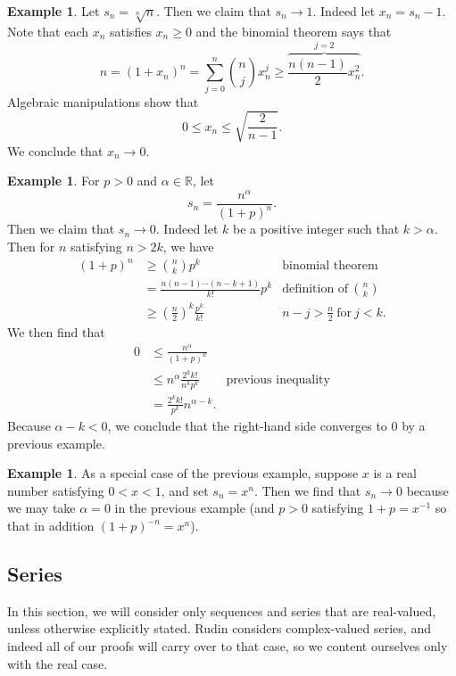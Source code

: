 \documentclass[12pt]{article}
\theoremstyle{definition}
\newtheorem{example}[definition]{Example}
\theoremstyle{theorem}
\begin{document}
\begin{example}
Let $s_n = \sqrt[n]{n}$. Then we claim that $s_n \to 1$. Indeed let $x_n = s_n - 1$. Note that each $x_n$ satisfies $x_n \geqslant 0$ and the binomial theorem says that 
\[
n = (1 + x_n)^n = \sum_{j=0}^n {{n}\choose{j}} x_n^j \geqslant \overbrace{\frac{n(n-1)}{2}x_n^2}^{j=2}.
\]
Algebraic manipulations show that 
\[
0 \leqslant x_n \leqslant \sqrt{\frac{2}{n-1}}.
\]
We conclude that $x_n \to 0$. 
\end{example}

\begin{example}
For $p > 0$ and $\alpha \in \mathbb{R}$, let 
\[
s_n = \frac{n^\alpha}{(1 + p)^n}.
\]
Then we claim that $s_n \to 0$. Indeed let $k$ be a positive integer such that $k > \alpha$. Then for $n$ satisfying $n > 2k$, we have 
\begin{align*}
(1 + p)^n &\geqslant {{n}\choose{k}}p^k &\text{binomial theorem}\\
&= \frac{n (n-1) \cdots (n-k+1)}{k!} p^k &\text{definition of}\: {{n}\choose{k}}\\
&\geqslant \left(\frac{n}{2}\right)^k \frac{p^k}{k!} & n-j > \frac{n}{2} \: \text{for} \: j <k.
\end{align*}
We then find that 
\begin{align*}
0 &\leqslant \frac{n^\alpha}{(1+p)^n} \\
&\leqslant n^\alpha \frac{2^k k!}{n^k p^k} &\text{previous inequality} \\
&= \frac{2^kk!}{p^k} n^{\alpha - k}.
\end{align*}
Because $\alpha - k < 0$, we conclude that the right-hand side converges to $0$ by a previous example. 
\end{example}

\begin{example}
As a special case of the previous example, suppose $x$ is a real number satisfying $0 < x < 1$, and set $s_n = x^n$. Then we find that $s_n \to 0$ because we may take $\alpha = 0$ in the previous example (and $p > 0$ satisfying $1 + p = x^{-1}$ so that in addition $(1+p)^{-n} = x^n$).
\end{example}

\subsection{Series}

In this section, we will consider only sequences and series that are real-valued, unless otherwise explicitly stated. Rudin considers complex-valued series, and indeed all of our proofs will carry over to that case, so we content ourselves only with the real case.
\end{document}
